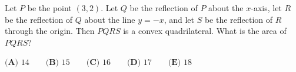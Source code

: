 Let \(P\) be the point \((3,2)\). Let \(Q\) be the reflection of \(P\) about the \(x\)-axis, let \(R\) be the reflection of \(Q\) about the line \(y=-x\), and let \(S\) be the reflection of \(R\) through the origin. Then \(PQRS\) is a convex quadrilateral. What is the area of \(PQRS\)?

\(\textbf{(A) }14\qquad\textbf{(B) }15\qquad\textbf{(C) }16\qquad\textbf{(D) }17\qquad\textbf{(E) }18\)
